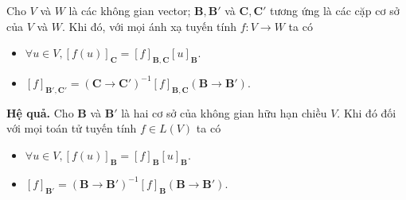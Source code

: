 \begin{mybox}
\begin{theorem}
Cho $V$ và $W$ là các không gian vector; $\mathbf{B}, \mathbf{B'}$ và $\mathbf{C}, \mathbf{C'}$ tương ứng là các cặp cơ sở của $V$ và $W.$ Khi đó, với mọi ánh xạ tuyến tính $f: V \to W$ ta có
\begin{itemize}
\item $\forall u \in V,{\left[ {f\left( u \right)} \right]_{\mathbf{C}}} = {\left[ f \right]_{\mathbf{B},\mathbf{C}}}{\left[ u \right]_{\mathbf{B}}}.$
\item ${\left[ f \right]_{\mathbf{B'},\mathbf{C'}}} = {\left( {\mathbf{C} \to \mathbf{C'}} \right)^{ - 1}}{\left[ f \right]_{\mathbf{B},\mathbf{C}}}\left( {\mathbf{B} \to \mathbf{B'}} \right).$
\end{itemize}
\end{theorem}
\end{mybox}
\textbf{Hệ quả.} Cho $\mathbf{B}$ và $\mathbf{B'}$ là hai cơ sở của không gian hữu hạn chiều $V.$ Khi đó đối với mọi toán tử tuyến tính $f \in L \left( V \right)$ ta có
\begin{itemize}
\item $\forall u \in V,{\left[ {f\left( u \right)} \right]_{\mathbf{B}}} = {\left[ f \right]_{\mathbf{B}}}{\left[ u \right]_{\mathbf{B}}}.$
\item ${\left[ f \right]_{\mathbf{B'}}} = \left(\mathbf{B}  \to \mathbf{B'} \right)^{-1}{\left[ f \right]_{\mathbf{B}}}\left(\mathbf{B}  \to \mathbf{B'} \right).$
\end{itemize}